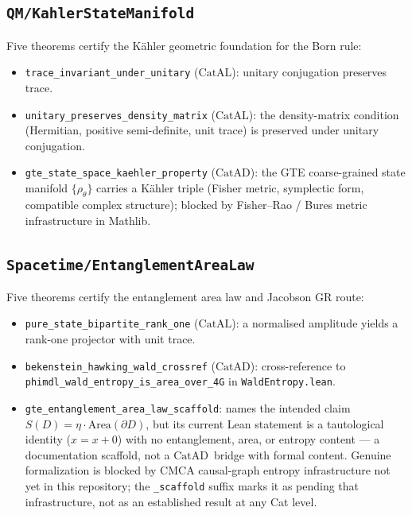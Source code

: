 \documentclass[11pt,a4paper]{article}
\theoremstyle{definition}
\newcommand{\CatAL}{\ensuremath{\mathrm{CatAL}}}
\newcommand{\CatAD}{\ensuremath{\mathrm{CatAD}}}
\begin{document}
\subsection{\texttt{QM/KahlerStateManifold}}\label{subsec:kahler}

Five theorems certify the Kähler geometric foundation for the Born rule:
\begin{itemize}[nosep]
\item \lstinline|trace_invariant_under_unitary| (\CatAL): unitary conjugation preserves trace.
\item \lstinline|unitary_preserves_density_matrix| (\CatAL): the density-matrix condition
  (Hermitian, positive semi-definite, unit trace) is preserved under unitary conjugation.
\item \lstinline|gte_state_space_kaehler_property| (\CatAD): the GTE coarse-grained state
  manifold $\{\rho_\theta\}$ carries a Kähler triple (Fisher metric, symplectic form,
  compatible complex structure); blocked by Fisher–Rao / Bures metric infrastructure
  in Mathlib.
\end{itemize}

\subsection{\texttt{Spacetime/EntanglementAreaLaw}}\label{subsec:entanglement-area}

Five theorems certify the entanglement area law and Jacobson GR route:
\begin{itemize}[nosep]
\item \lstinline|pure_state_bipartite_rank_one| (\CatAL): a normalised amplitude yields
  a rank-one projector with unit trace.
\item \lstinline|bekenstein_hawking_wald_crossref| (\CatAD): cross-reference to
  \lstinline|phimdl_wald_entropy_is_area_over_4G| in \texttt{WaldEntropy.lean}.
\item \lstinline|gte_entanglement_area_law_scaffold|: names the intended claim
  $S(D) = \eta\cdot\mathrm{Area}(\partial D)$, but its current Lean statement is a
  tautological identity ($x = x+0$) with no entanglement, area, or entropy
  content --- a documentation scaffold, not a \CatAD\ bridge with formal
  content.  Genuine formalization is blocked by CMCA causal-graph entropy
  infrastructure not yet in this repository; the \lstinline|_scaffold| suffix
  marks it as pending that infrastructure, not as an established result at
  any Cat level.
\end{itemize}
\end{document}

